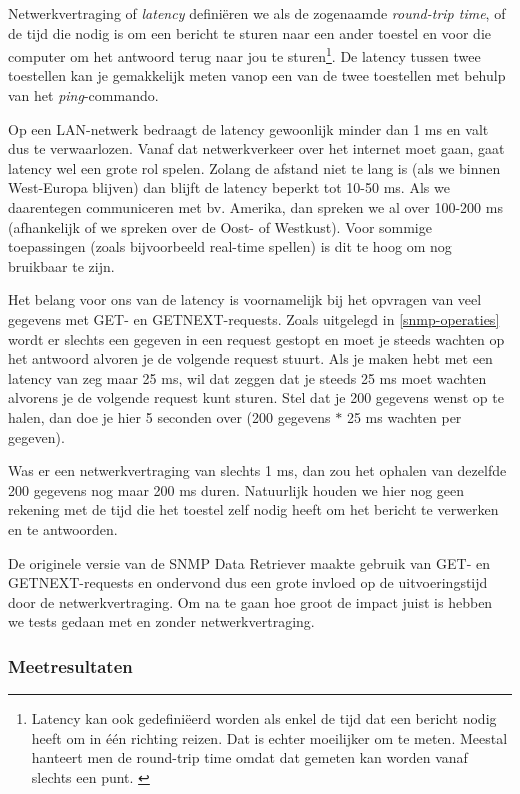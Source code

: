 Netwerkvertraging of \textit{latency} definiëren we als de zogenaamde \textit{round-trip time},
of de tijd die nodig is om een bericht te sturen naar een ander toestel en voor die computer om het antwoord terug naar jou te sturen\footnote{
	Latency kan ook gedefiniëerd worden als enkel de tijd dat een bericht nodig heeft om in één richting reizen.
	Dat is echter moeilijker om te meten. Meestal hanteert men de round-trip time omdat dat gemeten kan worden vanaf slechts een punt. \cite{latency-wiki}
}.
De latency tussen twee toestellen kan je gemakkelijk meten vanop een van de twee toestellen met behulp van het \textit{ping}-commando.

Op een LAN-netwerk bedraagt de latency gewoonlijk minder dan 1 ms en valt dus te verwaarlozen.
Vanaf dat netwerkverkeer over het internet moet gaan, gaat latency wel een grote rol spelen.
Zolang de afstand niet te lang is (als we binnen West-Europa blijven) dan blijft de latency beperkt tot 10-50 ms.
Als we daarentegen communiceren met bv. Amerika, dan spreken we al over 100-200 ms (afhankelijk of we spreken over de Oost- of Westkust).
Voor sommige toepassingen (zoals bijvoorbeeld real-time spellen) is dit te hoog om nog bruikbaar te zijn.

Het belang voor ons van de latency is voornamelijk bij het opvragen van veel gegevens met GET- en GETNEXT-requests.
Zoals uitgelegd in \cref{snmp-operaties} wordt er slechts een gegeven in een request gestopt en
moet je steeds wachten op het antwoord alvoren je de volgende request stuurt.
Als je maken hebt met een latency van zeg maar 25 ms, wil dat zeggen dat je steeds 25 ms moet wachten alvorens je de volgende request kunt sturen.
Stel dat je 200 gegevens wenst op te halen, dan doe je hier 5 seconden over (200 gegevens $*$ 25 ms wachten per gegeven).

Was er een netwerkvertraging van slechts 1 ms, dan zou het ophalen van dezelfde 200 gegevens nog maar 200 ms duren.
Natuurlijk houden we hier nog geen rekening met de tijd die het toestel zelf nodig heeft om het bericht te verwerken en te antwoorden.

De originele versie van de SNMP Data Retriever maakte gebruik van GET- en GETNEXT-requests en ondervond dus een grote invloed op de uitvoeringstijd door de netwerkvertraging.
Om na te gaan hoe groot de impact juist is hebben we tests gedaan met en zonder netwerkvertraging.

\subsubsection{Meetresultaten}

